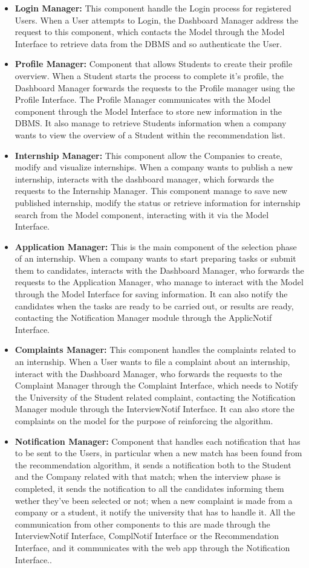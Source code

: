 \begin{itemize}
    \item \textbf{Login Manager:} This component handle the Login process for registered Users. When a User attempts to Login, the Dashboard Manager address the request to this component, which contacts the Model through the Model Interface to retrieve data from the DBMS and so authenticate the User. 
    \item \textbf{Profile Manager:} Component that allows Students to create their profile overview. When a Student starts the process to complete it's profile, the Dashboard Manager forwards the requests to the Profile manager using the Profile Interface. The Profile Manager communicates with the Model component through the Model Interface to store new information in the DBMS. It also manage to retrieve Students information when a company wants to view the overview of a Student within the recommendation list.
    \item \textbf{Internship Manager:} This component allow the Companies to create, modify and visualize internships. When a company wants to publish a new internship, interacts with the dashboard manager, which forwards the requests to the Internship Manager. This component manage to save new published internship, modify the status or retrieve information for internship search from the Model component, interacting with it via the Model Interface.
    \item \textbf{Application Manager:} This is the main component of the selection phase of an internship. When a company wants to start preparing tasks or submit them to candidates, interacts with the Dashboard Manager, who forwards the requests to the Application Manager, who manage to interact with the Model through the Model Interface for saving information. It can also notify the candidates when the tasks are ready to be carried out, or results are ready, contacting the Notification Manager module through the ApplicNotif Interface.
    \item \textbf{Complaints Manager:} This component handles the complaints related to an internship. When a User wants to file a complaint about an internship, interact with the Dashboard Manager, who forwards the requests to the Complaint Manager through the Complaint Interface, which needs to Notify the University of the Student related complaint, contacting the Notification Manager module through the InterviewNotif Interface. It can also store the complaints on the model for the purpose of reinforcing the algorithm.
    \item \textbf{Notification Manager:} Component that handles each notification that has to be sent to the Users, in particular when a new match has been found from the recommendation algorithm, it sends a notification both to the Student and the Company related with that match; when the interview phase is completed, it sends the notification to all the candidates informing them wether they've been selected or not; when a new complaint is made from a company or a student, it notify the university that has to handle it. All the communication from other components to this are made through the InterviewNotif Interface, ComplNotif Interface or the Recommendation Interface, and it communicates with the web app through the Notification Interface..

\end{itemize}
